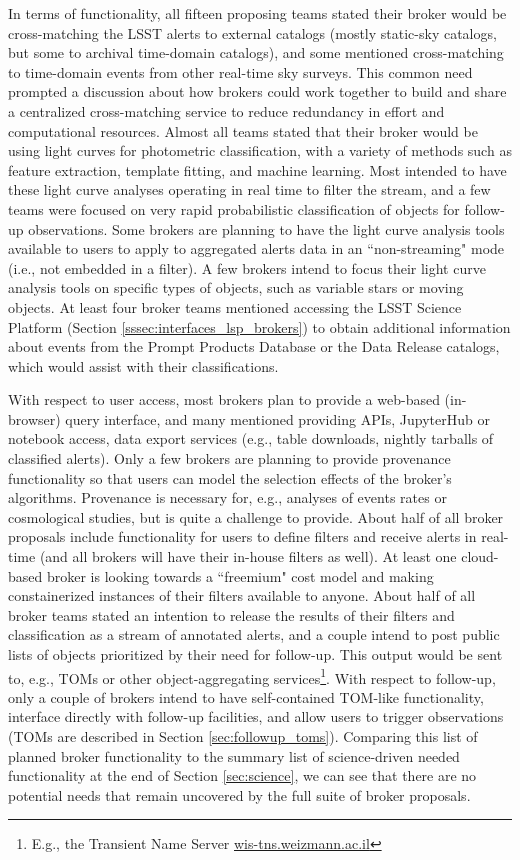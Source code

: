 In terms of functionality, all fifteen proposing teams stated their broker would be cross-matching the LSST alerts to external catalogs (mostly static-sky catalogs, but some to archival time-domain catalogs), and some mentioned cross-matching to time-domain events from other real-time sky surveys.
This common need prompted a discussion about how brokers could work together to build and share a centralized cross-matching service to reduce redundancy in effort and computational resources.
Almost all teams stated that their broker would be using light curves for photometric classification, with a variety of methods such as feature extraction, template fitting, and machine learning.
Most intended to have these light curve analyses operating in real time to filter the stream, and a few teams were focused on very rapid probabilistic classification of objects for follow-up observations. 
Some brokers are planning to have the light curve analysis tools available to users to apply to aggregated alerts data in an ``non-streaming" mode (i.e., not embedded in a filter). 
A few brokers intend to focus their light curve analysis tools on specific types of objects, such as variable stars or moving objects.
At least four broker teams mentioned accessing the LSST Science Platform (Section \ref{sssec:interfaces_lsp_brokers}) to obtain additional information about events from the Prompt Products Database or the Data Release catalogs, which would assist with their classifications.

With respect to user access, most brokers plan to provide a web-based (in-browser) query interface, and many mentioned providing APIs, JupyterHub or notebook access, data export services (e.g., table downloads, nightly tarballs of classified alerts).
Only a few brokers are planning to provide provenance functionality so that users can model the selection effects of the broker's algorithms.
Provenance is necessary for, e.g., analyses of events rates or cosmological studies, but is quite a challenge to provide.
About half of all broker proposals include functionality for users to define filters and receive alerts in real-time (and all brokers will have their in-house filters as well).
At least one cloud-based broker is looking towards a ``freemium" cost model and making constainerized instances of their filters available to anyone. 
About half of all broker teams stated an intention to release the results of their filters and classification as a stream of annotated alerts, and a couple intend to post public lists of objects prioritized by their need for follow-up.
This output would be sent to, e.g., TOMs or other object-aggregating services\footnote{E.g., the Transient Name Server \url{wis-tns.weizmann.ac.il}}.
With respect to follow-up, only a couple of brokers intend to have self-contained TOM-like functionality, interface directly with follow-up facilities, and allow users to trigger observations (TOMs are described in Section \ref{sec:followup_toms}).
Comparing this list of planned broker functionality to the summary list of science-driven needed functionality at the end of Section \ref{sec:science}, we can see that there are no potential needs that remain uncovered by the full suite of broker proposals.

